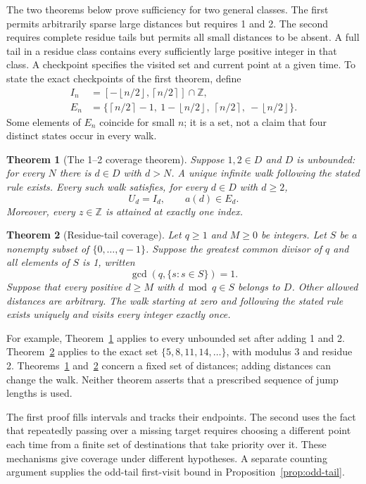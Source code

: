 \documentclass[11pt,a4paper]{article}
\newtheorem{maintheorem}{Theorem}
\newcommand{\Z}{\mathbb Z}\newcommand{\N}{\mathbb N}
\newcommand{\floor}[1]{\left\lfloor #1\right\rfloor}
\newcommand{\ceil}[1]{\left\lceil #1\right\rceil}
\begin{document}
The two theorems below prove sufficiency for two general classes. The first permits arbitrarily
sparse large distances but requires 1 and 2. The second requires complete
residue tails but permits all small distances to be absent. A full tail in
a residue class contains every sufficiently large positive integer in that
class. A checkpoint specifies the visited set and current point at a given
time. To state the exact checkpoints of the first theorem, define
\begin{align}
 I_n&=[-\floor{n/2},\ceil{n/2}]\cap\Z,\label{eq:box}\\
 E_n&=\{\ceil{n/2}-1,\ 1-\floor{n/2},\ \ceil{n/2},\ -\floor{n/2}\}.
 \label{eq:ends}
\end{align}
Some elements of $E_n$ coincide for small $n$; it is a set, not a claim
that four distinct states occur in every walk.

\begin{maintheorem}[The 1--2 coverage theorem]\label{thm:main}
Suppose $1,2\in D$ and $D$ is unbounded: for every $N$ there is $d\in D$
with $d>N$. A unique infinite walk following the stated rule exists. Every such
walk satisfies, for every $d\in D$ with $d\ge2$,
\[
 U_d=I_d,\qquad a(d)\in E_d.
\]
Moreover, every $z\in\Z$ is attained at exactly one index.
\end{maintheorem}

\begin{maintheorem}[Residue-tail coverage]\label{thm:residue-tail}
Let $q\ge1$ and $M\ge0$ be integers. Let $S$ be a nonempty subset of
$\{0,\ldots,q-1\}$. Suppose the greatest common divisor of $q$ and all
elements of $S$ is 1, written
\[
 \gcd(q,\{s:s\in S\})=1.
\]
Suppose that every positive $d\ge M$ with $d\bmod q\in S$ belongs to $D$.
Other allowed distances are arbitrary. The walk starting at zero and following the stated rule
exists uniquely and visits every integer exactly once.
\end{maintheorem}

For example, Theorem~\ref{thm:main} applies to every unbounded set after
adding 1 and 2. Theorem~\ref{thm:residue-tail} applies to the exact set
$\{5,8,11,14,\ldots\}$, with modulus 3 and residue 2.
Theorems~\ref{thm:main} and~\ref{thm:residue-tail} concern a fixed set of
distances; adding distances can change the walk.
Neither theorem asserts that a prescribed sequence of jump lengths is used.

The first proof fills intervals and tracks their endpoints. The second
uses the fact that repeatedly passing over a missing target requires
choosing a different point each time from a finite set of destinations that
take priority over it. These
mechanisms give coverage under different hypotheses. A separate counting
argument supplies the odd-tail first-visit bound in
Proposition~\ref{prop:odd-tail}.
\end{document}
